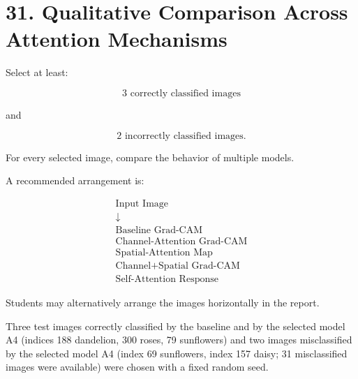 \documentclass[10pt]{article}
\begin{document}
\section*{31. Qualitative Comparison Across Attention Mechanisms}

Select at least:

\[
\boxed{
3\text{ correctly classified images}
}
\]

and

\[
\boxed{
2\text{ incorrectly classified images}.
}
\]

For every selected image, compare the behavior of multiple models.

A recommended arrangement is:

\[
\boxed{
\begin{array}{c}
\text{Input Image}\\
\downarrow\\
\text{Baseline Grad-CAM}\\
\text{Channel-Attention Grad-CAM}\\
\text{Spatial-Attention Map}\\
\text{Channel+Spatial Grad-CAM}\\
\text{Self-Attention Response}
\end{array}
}
\]

Students may alternatively arrange the images horizontally in the report.


Three test images correctly classified by the baseline and by the selected model A4 (indices 188 dandelion, 300 roses, 79 sunflowers) and two images misclassified by the selected model A4 (index 69 sunflowers, index 157 daisy; 31 misclassified images were available) were chosen with a fixed random seed.

\begin{center}
\end{center}
\end{document}
